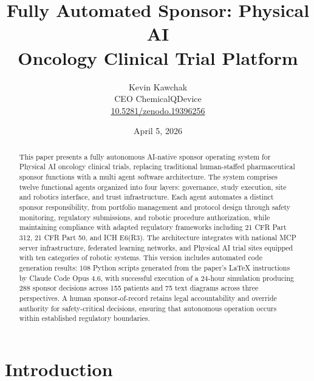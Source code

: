 \documentclass{article}
\title{Fully Automated Sponsor: Physical AI\\Oncology Clinical Trial Platform}
\author{
  Kevin Kawchak\hspace{2pt}\orcidicon{0009-0007-5457-8667} \\
  CEO ChemicalQDevice\\
  \href{https://doi.org/10.5281/zenodo.19396256}{10.5281/zenodo.19396256} \\
}
\date{April 5, 2026}
\begin{document}
\maketitle

\begin{abstract}
\hspace{1.3em} This paper presents a fully autonomous AI-native sponsor operating system for Physical AI oncology clinical trials, replacing traditional
human-staffed pharmaceutical sponsor functions with a multi agent
software architecture. The system comprises twelve functional agents
organized into four layers: governance, study execution, site and
robotics interface, and trust infrastructure. Each agent automates a
distinct sponsor responsibility, from portfolio management and protocol
design through safety monitoring, regulatory submissions, and robotic
procedure authorization, while maintaining compliance with adapted
regulatory frameworks including 21 CFR Part 312, 21 CFR Part 50, and
ICH E6(R3). The architecture integrates with national MCP server
infrastructure, federated learning networks, and Physical AI trial
sites equipped with ten categories of robotic systems. This version
includes automated code generation results: 108 Python scripts
generated from the paper's LaTeX instructions by Claude Code Opus 4.6,
with successful execution of a 24-hour simulation producing 288
sponsor decisions across 155 patients and 75 text diagrams across
three perspectives. A human sponsor-of-record retains legal
accountability and override authority for safety-critical decisions,
ensuring that autonomous operation occurs within established
regulatory boundaries.
\end{abstract}


\vspace{-0.2cm}

\section{Introduction}
\label{sec:introduction}

\end{document}
